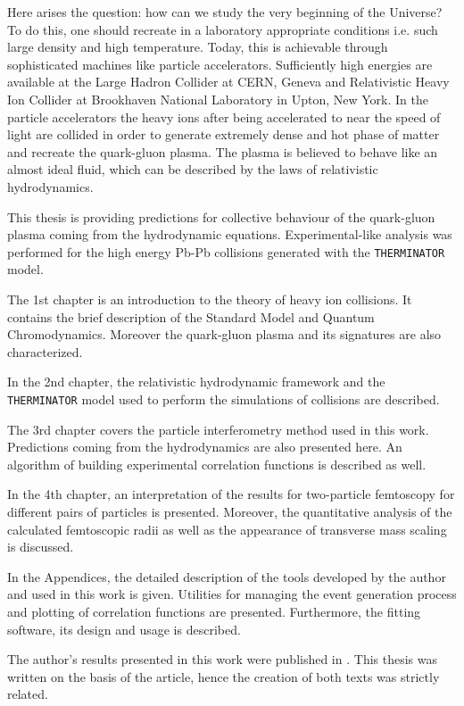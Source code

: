 Here arises the question: how can we study the very beginning of the Universe?
To do this, one should recreate in a laboratory appropriate conditions i.e. such large density and high temperature.
Today, this is achievable through sophisticated machines like particle accelerators.
Sufficiently high energies are available at the Large Hadron Collider at CERN, Geneva and Relativistic Heavy Ion Collider at Brookhaven National Laboratory in Upton, New York.
In the particle accelerators the heavy ions after being accelerated to near the speed of light are collided in order to generate extremely dense and hot phase of matter and recreate the quark-gluon plasma.
The plasma is believed to behave like an almost ideal fluid, which can be described by the laws of relativistic hydrodynamics.

This thesis is providing predictions for collective behaviour of the quark-gluon plasma coming from the hydrodynamic equations.
Experimental-like analysis was performed for the high energy Pb-Pb collisions generated with the \verb|THERMINATOR| model.

The 1st chapter is an introduction to the theory of heavy ion collisions.
It contains the brief description of the Standard Model and Quantum Chromodynamics.
Moreover the quark-gluon plasma and its signatures are also characterized.

In the 2nd chapter, the relativistic hydrodynamic framework and the \verb|THERMINATOR| model used to perform the simulations of collisions are described.

The 3rd chapter covers the particle interferometry method used in this work.
Predictions coming from the hydrodynamics are also presented here.
An algorithm of building experimental correlation functions is described as well.

In the 4th chapter, an interpretation of the results for two-particle femtoscopy for different pairs of particles is presented.
Moreover, the quantitative analysis of the calculated femtoscopic radii as well as the appearance of transverse mass scaling is discussed.

In the Appendices, the detailed description of the tools developed by the author and used in this work is given.
Utilities for managing the event generation process and plotting of correlation functions are presented.
Furthermore, the fitting software, its design and usage is described.

The author's results presented in this work were published in \cite{galazyn}.
This thesis was written on the basis of the article, hence the creation of both texts was strictly related.